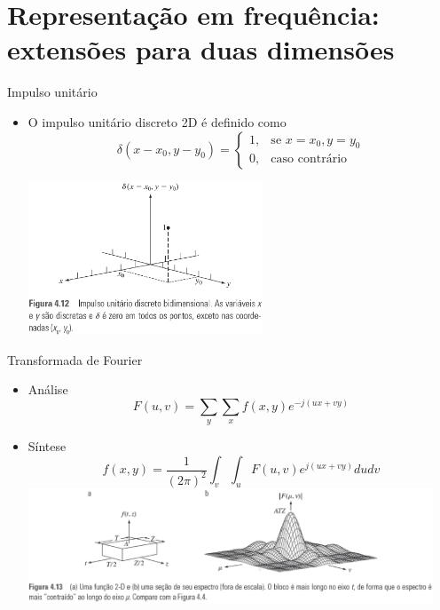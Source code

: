 \section[ slide = true ]{Representação em frequência: extensões para duas dimensões}
      \begin{slide}[toc=]{Impulso unitário}
         \begin{itemize}[type=1]
            \item O impulso unitário discreto 2D é definido como 
            \begin{equation*}
               \delta(x-x_0,y-y_0) = \begin{cases}
                                1, & \text{se } x=x_0, y=y_0\\
                                0, & \text{caso contrário}
                             \end{cases}
            \end{equation*}
			 \begin{center}
				 \includegraphics[width=0.55\textwidth]{figs/fig0412}
			 \end{center}
         \end{itemize}
      \end{slide}
      
      \begin{slide}[toc=]{Transformada de Fourier}
         \begin{itemize}[type=1]
            \item Análise
            \begin{equation*}
               F(u,v) = \sum_y\sum_x f(x,y) e^{-j(ux+vy)}
            \end{equation*}
            \item Síntese
            \begin{equation*}
               f(x,y) = \frac{1}{(2\pi)^2}\int_v\int_u F(u,v) e^{j(ux+vy)}du dv
            \end{equation*}
            \includegraphics[width=0.95\textwidth]{figs/fig0413}
         \end{itemize}
      \end{slide}
      
